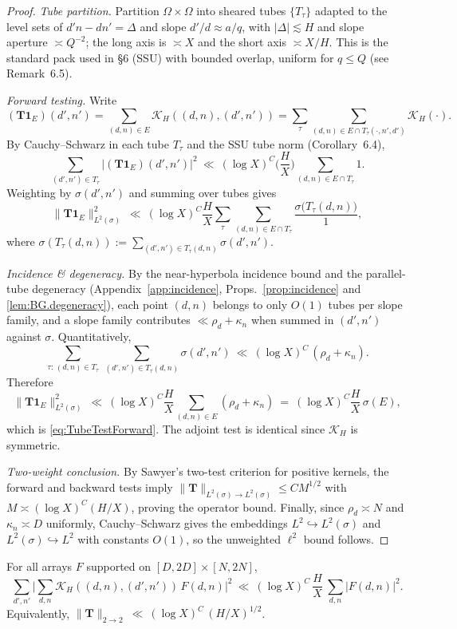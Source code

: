 \begin{proof}
\emph{Tube partition.} Partition $\Omega\times\Omega$ into sheared tubes $\{T_\tau\}$ adapted to the level sets of $d'n-dn'=\Delta$ and slope $d'/d\approx a/q$, with $|\Delta|\lesssim H$ and slope aperture $\asymp Q^{-2}$; the long axis is $\asymp X$ and the short axis $\asymp X/H$. This is the standard pack used in \S6 (SSU) with bounded overlap, uniform for $q\le Q$ (see Remark~6.5). 

\emph{Forward testing.} Write
\[
(\mathbf T\mathbf 1_E)(d',n')=\sum_{(d,n)\in E}\!\mathcal K_H((d,n),(d',n'))=\sum_\tau \sum_{(d,n)\in E\cap T_\tau(\cdot,n',d')}\!\mathcal K_H(\cdot).
\]
By Cauchy--Schwarz in each tube $T_\tau$ and the SSU tube norm (Corollary~6.4),
\[
\sum_{(d',n')\in T_\tau}\!\big|(\mathbf T\mathbf 1_E)(d',n')\big|^2
\ \ll\ (\log X)^C \Big(\frac{H}{X}\Big) \sum_{(d,n)\in E\cap T_\tau} 1.
\]
Weighting by $\sigma(d',n')$ and summing over tubes gives
\[
\|\mathbf T\mathbf 1_E\|_{L^2(\sigma)}^2
\ \ll\ (\log X)^C\frac{H}{X}\sum_\tau \sum_{(d,n)\in E\cap T_\tau} \frac{\sigma\big(T_\tau(d,n)\big)}{1},
\]
where $\sigma(T_\tau(d,n)):=\sum_{(d',n')\in T_\tau(d,n)}\sigma(d',n')$.

\emph{Incidence \& degeneracy.} By the near-hyperbola incidence bound and the parallel-tube degeneracy (Appendix~\ref{app:incidence}, Props.~\ref{prop:incidence} and \ref{lem:BG.degeneracy}), each point $(d,n)$ belongs to only $O(1)$ tubes per slope family, and a slope family contributes $\ll \rho_d+\kappa_n$ when summed in $(d',n')$ against $\sigma$. Quantitatively,
\[
\sum_{\tau:\,(d,n)\in T_\tau}\ \sum_{(d',n')\in T_\tau(d,n)} \sigma(d',n')
\ \ll\ (\log X)^C\,(\rho_d+\kappa_n).
\]
Therefore
\[
\|\mathbf T\mathbf 1_E\|_{L^2(\sigma)}^2
\ \ll\ (\log X)^C\frac{H}{X}\sum_{(d,n)\in E} (\rho_d+\kappa_n)
\ =\ (\log X)^C\frac{H}{X}\,\sigma(E),
\]
which is \eqref{eq:TubeTestForward}. The adjoint test is identical since $\mathcal K_H$ is symmetric.

\emph{Two-weight conclusion.} By Sawyer’s two-test criterion for positive kernels, the forward and backward tests imply $\|\mathbf T\|_{L^2(\sigma)\to L^2(\sigma)}\le C M^{1/2}$ with $M\asymp (\log X)^C(H/X)$, proving the operator bound. Finally, since $\rho_d\asymp N$ and $\kappa_n\asymp D$ uniformly, Cauchy–Schwarz gives the embeddings
$L^2 \hookrightarrow L^2(\sigma)$ and $L^2(\sigma)\hookrightarrow L^2$ with constants $O(1)$, so the unweighted $\ell^2$ bound follows.\end{proof}

\begin{theorem}\label{thm:BG-nonflat}
For all arrays $F$ supported on $[D,2D]\times[N,2N]$,
\begin{equation}\label{eq:BG.2to2}
\sum_{d',n'}\Big|\sum_{d,n} \mathcal K_H((d,n),(d',n'))\,F(d,n)\Big|^2
\ \ll\ (\log X)^C\,\frac{H}{X}\ \sum_{d,n}|F(d,n)|^2.
\end{equation}
Equivalently, $\|\mathbf T\|_{2\to 2}\ \ll\ (\log X)^C\,(H/X)^{1/2}$.
\end{theorem}

